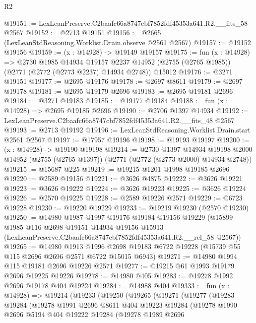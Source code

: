 \begin{lexlean}{R2}
\begin{coremodule}
@19151 := LexLeanPreserve.C2baafc66a8747cbf7852fdf45353a641.R2.__fits_58 @2567
@19152 := @2713 @19151
@19156 := @2665 (LexLeanStdReasoning.Worklist.Drain.observe @2561 @2567)
@19157 := @19152 @19156
@19159 := (x : @14928) -> @19149 @19157
@19175 := fun (x : @14928) =>
  @2730
    @1985
    @14934
    @19157
    @2237
    @14952
    (@2755 (@2765 @1985))
    (@2771 (@2772 (@2773 @2237) @14934 @2748))
    @15012
@19176 := @3271 @19151
@19177 := @2695 @19176
@19178 := @2697 @8611
@19179 := @2697 @19178
@19181 := @2695 @19179 @2696
@19183 := @2695 @19181 @2696
@19184 := @3271 @19183
@19185 := @19177 @19184
@19188 := fun (x : @14928) => @2695 @19185 @2696
@19190 := @2706 @1397 @14934
@19192 := LexLeanPreserve.C2baafc66a8747cbf7852fdf45353a641.R2.__fits_48 @2567
@19193 := @2713 @19192
@19196 := LexLeanStdReasoning.Worklist.Drain.start @2561 @2567
@19197 := @17957 @19196
@19198 := @19193 @19197
@19200 := (x : @14928) -> @19190 @19198
@19214 := @2730
    @1397
    @14934
    @19198
    @2000
    @14952
    (@2755 (@2765 @1397))
    (@2771 (@2772 (@2773 @2000) @14934 @2748))
@19215 := @15687 @225
@19219 := @19215 @1201 @1998 @19185 @2696
@19220 := @2589 @19156
@19221 := @3626 @4875
@19222 := @3626 @19221
@19223 := @3626 @19222
@19224 := @3626 @19223
@19225 := @3626 @19224
@19226 := @2570 @19225
@19228 := @2589 @19226 @2571
@19229 := @6723 @19228
@19230 := @19220 @19229
@19233 := @19219 @19230 (@2570 @19230)
@19250 := @14980
    @1987
    @1997
    @19176
    @19184
    @19156
    @19229
    (@15899
      @1985
      @116
      @2698
      @19151
      @14934
      @19156
      @15913
      (LexLeanPreserve.C2baafc66a8747cbf7852fdf45353a641.R2.__rel_58 @2567))
@19265 := @14980
    @1913
    @1996
    @2698
    @19183
    @6722
    @19228
    (@15739 @55 @115 @2696 @2696 @2571 @6722 @15015 @6943)
@19271 := @14980 @1994 @115 @19181 @2696 @19226 @2571
@19277 := @19215 @61 @1993 @19179 @2696 @19225 @19226
@19278 := @14980 @405
@19283 := @19278 @1992 @2696 @19178 @404 @19224
@19284 := @14988 @404
@19333 := fun (x : @14928) =>
  @19214
    (@19233
      (@19250
        (@19265
          (@19271
            (@19277
              (@19283
                @19284
                (@19278
                  @1991
                  @2696
                  @8611
                  @404
                  @19223
                  @19284
                  (@19278
                    @1990
                    @2696
                    @5194
                    @404
                    @19222
                    @19284
                    (@19278
                      @1989
                      @2696

\end{coremodule}
\end{lexlean}

